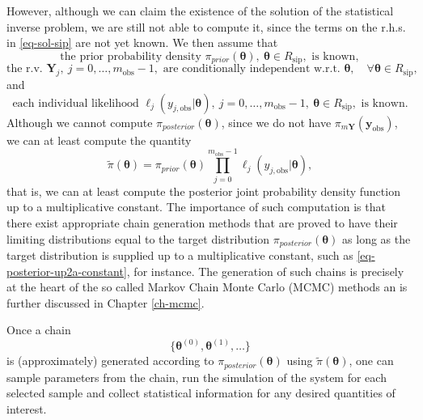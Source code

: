 However, although we can claim the existence of the solution of the statistical inverse problem,
we are still not able to compute it, since the terms on the r.h.s. in \eqref{eq-sol-sip} are not yet known.
We then assume that
\begin{equation}\label{eq-hyp-prior-known}
\text{the prior probability density }\pi_{prior}(\boldsymbol{\theta}),~\boldsymbol\theta\in R_{\text{sip}},\text{ is known},
\end{equation}
\begin{equation}\label{eq-hyp-conditional-independence}
\text{the r.v. }\mathbf{Y}_j,~j=0,\ldots,m_{\text{obs}}-1,\text{ are conditionally independent w.r.t. }\boldsymbol\theta,\quad\forall\boldsymbol\theta\in R_{\text{sip}},
\end{equation}
and
\begin{equation}\label{eq-hyp-l-known}
\text{each individual likelihood }\ell_j(y_{j,\text{obs}}|\boldsymbol\theta),~j=0,\ldots,m_{\text{obs}}-1,~\boldsymbol\theta\in R_{\text{sip}},\text{ is known}.
\end{equation}
Although we cannot compute $\pi_{posterior}(\boldsymbol\theta)$,
since we do not have $\pi_{m\mathbf{Y}}(\mathbf{y}_{\text{obs}})$,
we can at least compute the quantity
\begin{equation}\label{eq-posterior-up2a-constant}
\tilde{\pi}(\boldsymbol\theta) =
{\pi_{prior}(\boldsymbol\theta)\prod_{j=0}^{m_{\text{obs}}-1}\ell_j(y_{j,\text{obs}}|\boldsymbol\theta)},
\end{equation}
that is, we can at least compute the posterior joint probability density function up to a multiplicative constant.
The importance of such computation is that there exist
appropriate chain generation methods that are proved to have their limiting distributions equal 
to the target distribution $\pi_{posterior}(\boldsymbol\theta)$ as long as the target distribution is supplied
up to a multiplicative constant, such as \eqref{eq-posterior-up2a-constant}, for instance.
The generation of such chains is precisely at the heart of the so called Markov Chain Monte Carlo (MCMC) methods
an is further discussed in Chapter \ref{ch-mcmc}.

Once a chain
\begin{equation}\label{eq-markov-chain-1}
\{\boldsymbol{\theta}^{(0)},\boldsymbol{\theta}^{(1)},\ldots\}
\end{equation}
is (approximately) generated according to $\pi_{posterior}(\boldsymbol\theta)$ using $\tilde{\pi}(\boldsymbol\theta)$,
one can
sample parameters from the chain,
run the simulation of the system for each selected sample and
collect statistical information for any desired quantities of interest.

